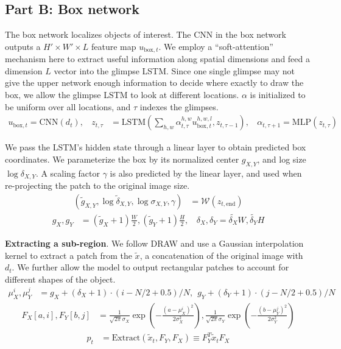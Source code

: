 \subsection{Part B: Box network}

The box network localizes objects of interest. The CNN in the box network
outputs a $H' \times W' \times L$ feature map $u_{\text{box}, t}$. We employ a
``soft-attention'' mechanism here to extract useful information along spatial
dimensions and feed a dimension $L$ vector into the glimpse LSTM. Since one
single glimpse may not give the upper network enough information to decide
where exactly to draw the box, we allow the glimpse LSTM to look at different
locations.  $\alpha$ is  initialized to be uniform over all locations, and
$\tau$ indexes the glimpses.
\vspace{-1pt}
\begin{align}
u_{\text{box},t} = \text{CNN}(d_t), \ \ \ \
z_{t, \tau} &= \text{LSTM} (
\sum_{h, w} \alpha^{h, w}_{t, \tau} u^{h,w,l}_{\text{box},t}, z_{t, \tau-1} ), \ \ \ \
\alpha_{t, \tau+1} = \text{MLP}(z_{t, \tau})
\end{align}
\vspace{-6pt}

We pass the LSTM's hidden state through a linear layer to obtain predicted
box coordinates. We parameterize the box by its normalized center
$g_{X,Y}$, and log size $\log \delta_{X,Y}$. A scaling factor $\gamma$ is
also predicted by the linear layer, and used when re-projecting the patch
to the original image size.
\vspace{-1pt}
\begin{align}
(\tilde{g}_{X,Y}, \log \tilde{\delta}_{X,Y}, \log \sigma_{X,Y}, \gamma) &= \mathcal{W}(z_{t, \text{end}})
\end{align}
\begin{align}
g_X, g_Y &= (\tilde{g}_X+1)\frac{W}{2}, (\tilde{g}_Y+1)\frac{H}{2}, \ \ \ \  
\delta_X, \delta_Y = \tilde{\delta_X} W, \tilde{\delta_Y} H
\end{align}
\vspace{-6pt}

\textbf{Extracting a sub-region}. We follow DRAW \cite{gregor15draw} and use a
Gaussian interpolation kernel to extract a patch from the $\tilde{x}$, a
concatenation of the original image with $d_t$. We further allow the model to
output rectangular patches to account for different shapes of the object.
\begin{align}
\mu_X^i, \mu_Y^j &= g_X + (\delta_X + 1) \cdot (i - N / 2 + 0.5) / N, \ \  
g_Y + (\delta_Y + 1) \cdot (j - N / 2 + 0.5) / N
\end{align}
\begin{align}
F_X[a, i], F_Y[b, j] &= 
\frac{1}{\sqrt{2\pi} \sigma_X} \exp \left(- \frac{(a -
\mu_X^i)^2}{2\sigma_X^2} \right), 
\frac{1}{\sqrt{2\pi} \sigma_Y} \exp \left(- \frac{(b -
\mu_Y^j)^2}{2\sigma_Y^2} \right)
\end{align}
\begin{align}
p_t &= \text{Extract}(\tilde{x}_t, F_Y, F_X) \equiv F_Y^T \tilde{x}_t F_X
\end{align}

